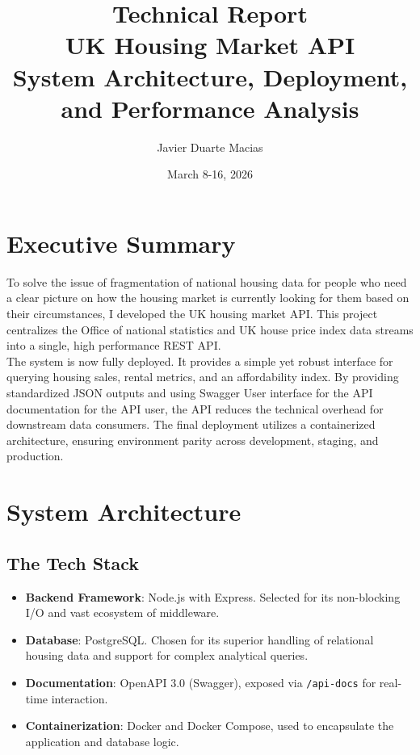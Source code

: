 \documentclass[11pt,a4paper]{article}
\begin{document}
\title{Technical Report\\UK Housing Market API\\\large System Architecture, Deployment, and Performance Analysis}
\author{Javier Duarte Macias}
\date{March 8-16, 2026}
\maketitle

\tableofcontents
\newpage

\section{Executive Summary}

To solve the issue of fragmentation of national housing data for people who need a clear picture on how the housing market is currently looking for them based on their circumstances, I developed the UK housing market API. This project centralizes the Office of national statistics and UK house price index data streams into a single, high performance REST API. \\

\noindent The system is now fully deployed. It provides a simple yet robust interface for querying housing sales, rental metrics, and an affordability index. By providing standardized JSON outputs and using Swagger User interface for the API documentation for the API user, the API reduces the technical overhead for downstream data consumers. The final deployment utilizes a containerized architecture, ensuring environment parity across development, staging, and production.

\section{System Architecture}

\subsection{The Tech Stack}

\begin{itemize}[nosep]
  \item \textbf{Backend Framework}: Node.js with Express. Selected for its non-blocking I/O and vast ecosystem of middleware.
  \item \textbf{Database}: PostgreSQL. Chosen for its superior handling of relational housing data and support for complex analytical queries.
  \item \textbf{Documentation}: OpenAPI 3.0 (Swagger), exposed via \texttt{/api-docs} for real-time interaction.
  \item \textbf{Containerization}: Docker and Docker Compose, used to encapsulate the application and database logic.
\end{itemize}
\end{document}
